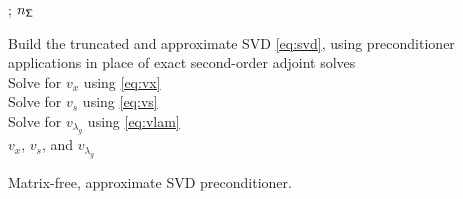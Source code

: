 \LinesNumberedHidden
\begin{algorithm}[tbp]
\SetEndCharOfAlgoLine{}

;  $n_{\mathsf{\Sigma}}$
 
\BlankLine
Build the truncated and approximate SVD \eqref{eq:svd}, using 
preconditioner applications in place of exact second-order adjoint solves \\
Solve for $v_x$ using \eqref{eq:vx}\\
Solve for $v_s$ using \eqref{eq:vs}\\
Solve for $v_{\lambda_g}$ using \eqref{eq:vlam}\\
\Return $v_x$, $v_s$, and $v_{\lambda_g}$
\caption{Matrix-free, approximate SVD preconditioner. \label{alg:precond}}
\end{algorithm}

